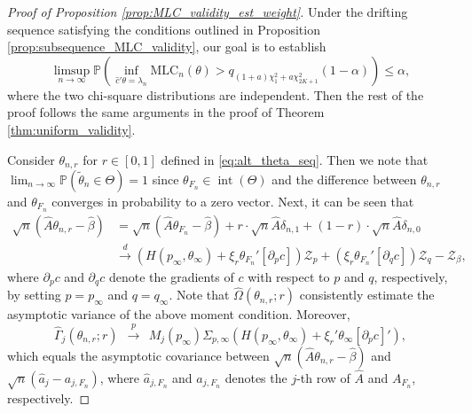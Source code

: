 \documentclass[11pt]{article}
\theoremstyle{definition}
\newcommand{\Prob}{\ensuremath{\mathbb{P}}} %
\newcommand{\0}{\ensuremath{\mathbf{0}}}
\begin{document}
\begin{bibunit}
%
\begin{proof}[Proof of Proposition \ref{prop:MLC_validity_est_weight}]
Under the drifting sequence satisfying the conditions outlined in Proposition \ref{prop:subsequence_MLC_validity}, our goal is to establish
\[
    \limsup_{n\to\infty} \Prob\left(\inf_{\hat{c}'\theta = \lambda_n} \text{MLC}_n(\theta) > q_{(1+a)\chi_1^2 + a\chi_{2K+1}^2}(1-\alpha)\right) \leq \alpha,
\]
where the two chi-square distributions are independent. Then the rest of the proof follows the same arguments in the proof of Theorem \ref{thm:uniform_validity}.

Consider $\theta_{n,r}$ for $r\in [0,1]$ defined in \eqref{eq:alt_theta_seq}. Then we note that $\lim_{n\to\infty}\Prob(\tilde{\theta}_n \in \Theta) = 1$ since $\theta_{F_n} \in \operatorname{int}(\Theta)$ and the difference between $\theta_{n,r}$ and $\theta_{F_n}$ converges in probability to a zero vector. Next, it can be seen that
\begin{align*}
    \sqrt{n}(\hat{A}{\theta}_{n,r} - \hat{\beta})
    &= \sqrt{n}(\hat{A}\theta_{F_n} - \hat{\beta}) + r\cdot \sqrt{n}\hat{A}\delta_{n,1} + (1-r) \cdot \sqrt{n}\hat{A}\delta_{n,0} \\
    &\xrightarrow{d} \left(H(p_\infty,\theta_\infty) + \xi_r \theta_{F_n}' [\partial_{p} c]\right) \mathcal{Z}_p + (\xi_r  \theta_{F_n}' [\partial_{q} c]) \mathcal{Z}_q - \mathcal{Z}_\beta,
\end{align*} 
where $\partial_p c$ and  $\partial_q c$ denote the gradients of $c$ with respect to $p$ and $q$, respectively, by setting $p = p_\infty$ and $q = q_\infty$. 
Note that $\hat{\Omega}(\theta_{n,r};r)$ consistently estimate the asymptotic variance of the above moment condition. Moreover, 
\[
    \hat{\Gamma}_j(\theta_{n,r};r)
    ~~\xrightarrow{p}~~
    M_j(p_\infty) \Sigma_{p,\infty} \left(H(p_\infty, \theta_\infty) + \xi_r'\theta_{\infty}[\partial_p c]'\right),
\]
which equals the asymptotic covariance between $\sqrt{n}(\hat{A}{\theta}_{n,r} - \hat{\beta})$ and $\sqrt{n}(\hat{a}_j - a_{j,F_n})$, where $\hat{a}_{j,F_n}$ and $a_{j,F_n}$ denotes the $j$-th row of $\hat{A}$ and $A_{F_n}$, respectively. 


\end{proof}
\end{bibunit}
\end{document}
